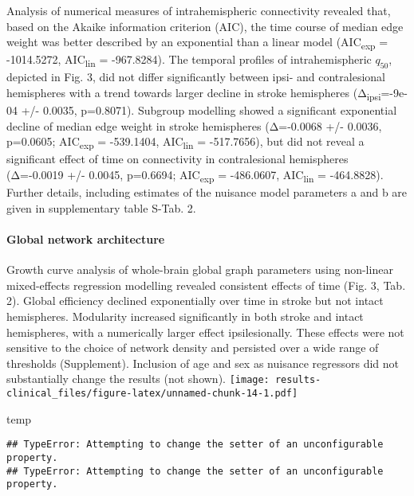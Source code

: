 \documentclass[]{article}
\newenvironment{Shaded}{\begin{snugshade}}{\end{snugshade}}
\newcommand{\NormalTok}[1]{#1}
\let\oldparagraph\paragraph
\renewcommand{\paragraph}[1]{\oldparagraph{#1}\mbox{}}
\begin{document}
Analysis of numerical measures of intrahemispheric connectivity revealed
that, based on the Akaike information criterion (AIC), the time course
of median edge weight was better described by an exponential than a
linear model (AIC\textsubscript{exp} = -1014.5272,
AIC\textsubscript{lin} = -967.8284). The temporal profiles of
intrahemispheric \(q_{50}\), depicted in Fig. 3, did not differ
significantly between ipsi- and contralesional hemispheres with a trend
towards larger decline in stroke hemispheres
(Δ\textsubscript{ipsi}=-9e-04 +/- 0.0035, p=0.8071). Subgroup modelling
showed a significant exponential decline of median edge weight in stroke
hemispheres (Δ=-0.0068 +/- 0.0036, p=0.0605; AIC\textsubscript{exp} =
-539.1404, AIC\textsubscript{lin} = -517.7656), but did not reveal a
significant effect of time on connectivity in contralesional hemispheres
(Δ=-0.0019 +/- 0.0045, p=0.6694; AIC\textsubscript{exp} = -486.0607,
AIC\textsubscript{lin} = -464.8828). Further details, including
estimates of the nuisance model parameters a and b are given in
supplementary table S-Tab. 2.

\hypertarget{global-network-architecture}{%
\paragraph{Global network
architecture}\label{global-network-architecture}}

Growth curve analysis of whole-brain global graph parameters using
non-linear mixed-effects regression modelling revealed consistent
effects of time (Fig. 3, Tab. 2). Global efficiency declined
exponentially over time in stroke but not intact hemispheres. Modularity
increased significantly in both stroke and intact hemispheres, with a
numerically larger effect ipsilesionally. These effects were not
sensitive to the choice of network density and persisted over a wide
range of thresholds (Supplement). Inclusion of age and sex as nuisance
regressors did not substantially change the results (not shown).
\texttt{[image: results-clinical\_files/figure-latex/unnamed-chunk-14-1.pdf]}

\begin{Shaded}
\begin{Highlighting}[]
\NormalTok{temp}
\end{Highlighting}
\end{Shaded}

\begin{verbatim}
## TypeError: Attempting to change the setter of an unconfigurable property.
## TypeError: Attempting to change the setter of an unconfigurable property.
\end{verbatim}
\end{document}
